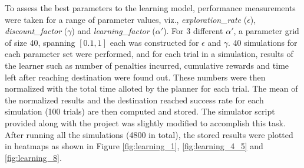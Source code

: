 \documentclass{article}
\begin{document}
	To assess the best parameters to the learning model, performance measurements were taken for a range of parameter values, viz., \emph{exploration\_rate} ($\epsilon$), \emph{discount\_factor} ($\gamma$) and \emph{learning\_factor} ($\alpha\prime$). For 3 different $\alpha\prime$, a parameter grid of size 40, spanning $[0.1,1]$ each was constructed for $\epsilon$ and $\gamma$. 40 simulations for each parameter set were performed, and for each trial in a simulation, results of the learner such as number of penalties incurred, cumulative rewards and time left after reaching destination were found out. These numbers were then normalized with the total time alloted by the planner for each trial. The mean of the normalized results and the destination reached success rate for each simulation (100 trials) are then computed and stored. The simulator script provided along with the project was slightly modified to accomplish this task. After running all the simulations (4800 in total), the stored results were plotted in heatmaps as shown in Figure \ref{fig:learning_1}, \ref{fig:learning_4_5} and \ref{fig:learning_8}. 
	
\end{document}
